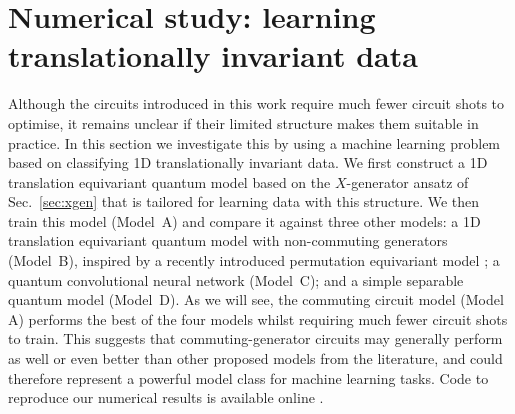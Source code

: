 \documentclass[a4paper,twocolumn,11pt]{quantumarticle}
\begin{document}
\section{Numerical study: learning translationally invariant data}\label{sec:numerics}
Although the circuits introduced in this work require much fewer circuit shots to optimise, it remains unclear if their limited structure makes them suitable in practice. In this section we investigate this by using a machine learning problem based on classifying 1D translationally invariant data. We first construct a 1D translation equivariant quantum model based on the $X$-generator ansatz of Sec.\ \ref{sec:xgen} that is tailored for learning data with this structure. We then train this model (Model~A) and compare it against three other models: a 1D translation equivariant quantum model with non-commuting generators (Model~B), inspired by a recently introduced permutation equivariant model \cite{schatzki2022theoretical}; a quantum convolutional neural network \cite{qconv,hur2022quantum} (Model~C); and a simple separable quantum model (Model~D). As we will see, the commuting circuit model (Model A) performs the best of the four models whilst requiring much fewer circuit shots to train. This suggests that commuting-generator circuits may generally perform as well or even better than other proposed models from the literature, and could therefore represent a powerful model class for machine learning tasks. Code to reproduce our numerical results is available online \cite{backpropscalingrepo}.
\end{document}
